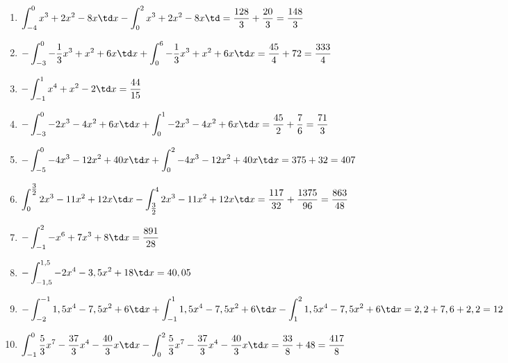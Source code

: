 \begin{Answer}[ref=flaecheRechnA1]\\
	\begin{enumerate}[label=\alph*)]
		\item \(\displaystyle\int_{-4}^{0} x^3+2x^2-8x\td x-\int_{0}^{2} x^3+2x^2-8x\td=\frac{128}{3}+\frac{20}{3}=\frac{148}{3}\)\\
		\item \(\displaystyle-\int_{-3}^{0} -\frac{1}{3}x^3+x^2+6x\td x+\int_{0}^{6} -\frac{1}{3}x^3+x^2+6x\td x=\frac{45}{4}+72=\frac{333}{4}\)\\
		\item \(\displaystyle-\int_{-1}^{1} x^4+x^2-2\td x=\frac{44}{15}\)\\
		\item \(\displaystyle-\int_{-3}^{0} -2x^3-4x^2+6x\td x+\int_{0}^{1} -2x^3-4x^2+6x\td x=\frac{45}{2}+\frac{7}{6}=\frac{71}{3}\)\\
		\item \(\displaystyle -\int_{-5}^{0}-4x^3-12x^2+40x \td x +\int_{0}^{2}-4x^3-12x^2+40x \td x=375+32=407\)\\
		\item \(\displaystyle \int_{0}^{\tfrac{3}{2}} 2x^3-11x^2+12x \td x - \int_{\tfrac{3}{2}}^{4} 2x^3-11x^2+12x \td x=\frac{117}{32}+\frac{1375}{96}=\frac{863}{48}\)\\
		\item \(\displaystyle -\int_{-1}^{2} -x^6+7x^3+8 \td x=\frac{891}{28}\)\\
		\item \(\displaystyle -\int_{-1,5}^{1,5} -2x^4-3,5x^2+18 \td x=40,05\)\\
		\item \(\displaystyle-\int_{-2}^{-1} 1,5x^4-7,5x^2+6\td x+\int_{-1}^{1} 1,5x^4-7,5x^2+6\td x-\int_{1}^{2} 1,5x^4-7,5x^2+6\td x=2,2+7,6+2,2=12\)\\
		\item \(\displaystyle \int_{-1}^{0} \frac{5}{3}x^7-\frac{37}{3}x^4-\frac{40}{3}x \td x-\int_{0}^{2} \frac{5}{3}x^7-\frac{37}{3}x^4-\frac{40}{3}x \td x=\frac{33}{8}+48=\frac{417}{8}\)		
	\end{enumerate}
\end{Answer}
